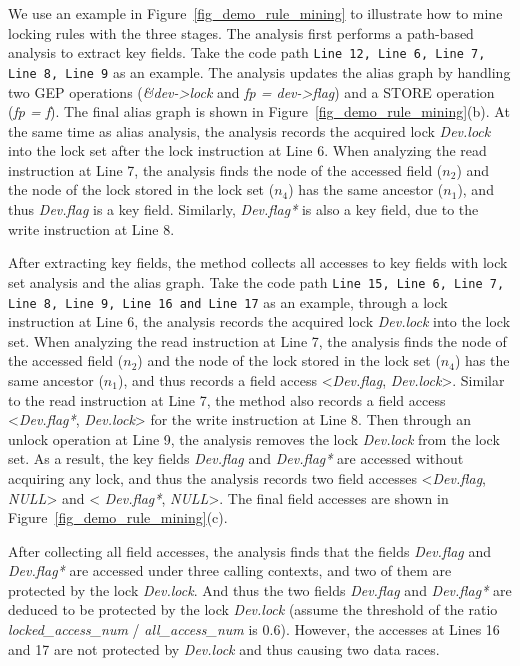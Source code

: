  We use an example in 
Figure~\ref{fig_demo_rule_mining} to illustrate how to mine locking rules 
with the three stages. The analysis first performs a path-based analysis to 
extract key fields. Take the code path {\tt Line 12, Line 6, Line 7, Line 8, 
Line 9} as an example. The analysis updates the alias graph by handling two GEP 
operations ({\em \&dev->lock} and {\em fp = dev->flag}) and a STORE operation 
({\em *fp = f}). The final alias graph is shown in 
Figure~\ref{fig_demo_rule_mining}(b). At the same time as alias analysis, the 
analysis records the acquired lock {\em Dev.lock} into the lock set after the 
lock instruction at Line 6. When analyzing the read instruction at Line 7, the 
analysis finds the node of the accessed field ($\mathit{n_2}$) and the node of 
the lock stored in the lock set ($\mathit{n_4}$) has the same ancestor 
($\mathit{n_1}$), and thus {\em Dev.flag} is a key field. Similarly, {\em 
Dev.flag*} is also a key field, due to the write instruction at Line 8. 

After extracting key fields, the method collects all accesses to key fields 
with lock set analysis and the alias graph. Take the code path {\tt Line 15, 
Line 6, Line 7, Line 8, Line 9, Line 16 and Line 17} as an example, through a 
lock instruction at Line 6, the analysis records the acquired lock {\em 
Dev.lock} into the lock set. When analyzing the read instruction at Line 7, the 
analysis finds the node of the accessed field ($\mathit{n_2}$) and the node of 
the lock stored in the lock set ($\mathit{n_4}$) has the same ancestor 
($\mathit{n_1}$), and thus records a field access <{\em Dev.flag}, {\em 
Dev.lock}>. Similar to the read instruction at Line 7, the method also records 
a field access <{\em Dev.flag*}, {\em Dev.lock}> for the write instruction at 
Line 8. Then through an unlock operation at Line 9, the analysis removes the 
lock {\em Dev.lock} from the lock set. As a result, the key fields {\em 
Dev.flag} and {\em Dev.flag*} are accessed without acquiring any lock, and thus 
the analysis records two field accesses <{\em Dev.flag}, {\em NULL}> and <{\em 
Dev.flag*}, {\em NULL}>. The final field accesses are shown in 
Figure~\ref{fig_demo_rule_mining}(c).

After collecting all field accesses, the analysis finds that the fields {\em 
Dev.flag} and {\em Dev.flag*} are accessed under three calling contexts, and 
two of them are protected by the lock {\em Dev.lock}. And thus the two fields 
{\em Dev.flag} and {\em Dev.flag*} are deduced to be protected by the lock {\em 
Dev.lock} (assume the threshold of the ratio {\em locked\_access\_num} / 
{\em all\_access\_num} is 0.6). However, the accesses at Lines 16 and 17 are 
not protected by {\em Dev.lock} and thus causing two data races.

